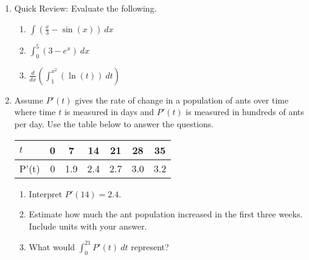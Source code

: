 \documentclass[11pt,fleqn]{article}
\begin{document}
\vspace*{-0.7in}

\begin{center}
  \Large{}
  \end{center}
\begin{enumerate}
\item Quick Review: Evaluate the following.
\begin{multicols}{3}
\begin{enumerate}
\item $\displaystyle{\int \left(\frac{x}{3}-\sin(x) \right) \: dx}$
\item $\displaystyle{\int_0^5 \left(3-e^x \right) \: dx}$
\item $\displaystyle{\frac{d}{dx} \left(\int_1^{x^2} \left(\ln(t)\right) \: dt\right)}$
\end{enumerate}
\end{multicols}

\vfill

\item Assume $P'(t)$ gives the rate of change in a population of ants over time where time $t$ is measured in days and $P'(t)$ is measured in hundreds of ants per day. Use the table below to answer the questions.\\

\begin{tabular}{l|c|c|c|c|c|c}
$t$&0&7&14&21&28&35\\
\hline
P'(t)&0&1.9&2.4&2.7&3.0&3.2\\
\end{tabular}
\begin{enumerate}
\item Interpret $P'(14)=2.4.$\\

\item Estimate how much the ant population increased in the first three weeks. Include units with your answer.\\
\vfill

\item What would $\displaystyle{\int_0^{21} P'(t)\: dt}$ represent? 
\vfill


\end{enumerate}
\end{enumerate}
\end{document}
